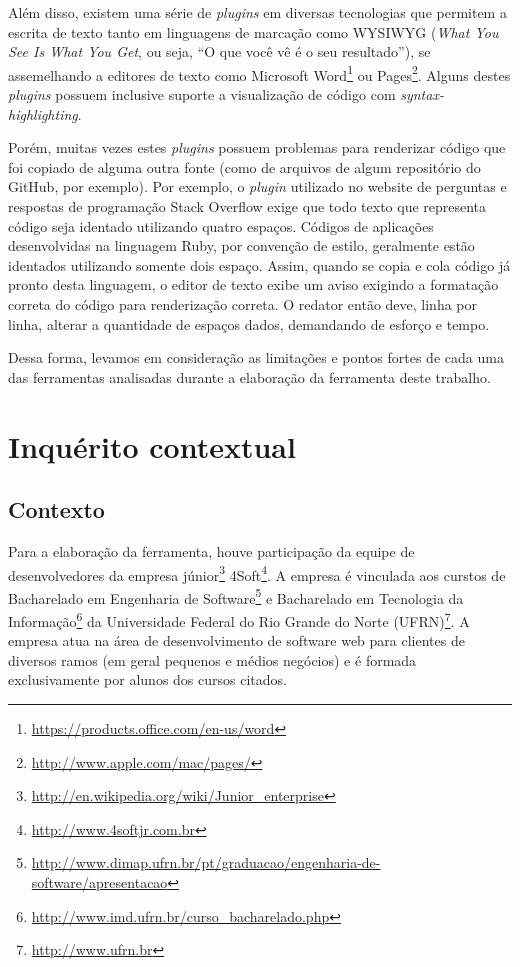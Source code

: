 Além disso, existem uma série de \textit{plugins} em diversas tecnologias que permitem a escrita de texto tanto em linguagens de marcação como WYSIWYG (\textit{What You See Is What You Get}, ou seja, ``O que você vê é o seu resultado''), se assemelhando a editores de texto como Microsoft Word\footnote{\url{https://products.office.com/en-us/word}} ou Pages\footnote{\url{http://www.apple.com/mac/pages/}}. Alguns destes \textit{plugins} possuem inclusive suporte a visualização de código com \textit{syntax-highlighting}.

Porém, muitas vezes estes \textit{plugins} possuem problemas para renderizar código que foi copiado de alguma outra fonte (como de arquivos de algum repositório do GitHub, por exemplo). Por exemplo, o \textit{plugin} utilizado no website de perguntas e respostas de programação Stack Overflow exige que todo texto que representa código seja identado utilizando quatro espaços. Códigos de aplicações desenvolvidas na linguagem Ruby, por convenção de estilo, geralmente estão identados utilizando somente dois espaço. Assim, quando se copia e cola código já pronto desta linguagem, o editor de texto exibe um aviso exigindo a formatação correta do código para renderização correta. O redator então deve, linha por linha, alterar a quantidade de espaços dados, demandando de esforço e tempo.


Dessa forma, levamos em consideração as limitações e pontos fortes de cada uma das ferramentas analisadas durante a elaboração da ferramenta deste trabalho.

\section{Inquérito contextual}


\subsection{Contexto}

Para a elaboração da ferramenta, houve participação da equipe de desenvolvedores da empresa júnior\footnote{\url{http://en.wikipedia.org/wiki/Junior_enterprise}} 4Soft\footnote{\url{http://www.4softjr.com.br}}. A empresa é vinculada aos curstos de Bacharelado em Engenharia de Software\footnote{\url{http://www.dimap.ufrn.br/pt/graduacao/engenharia-de-software/apresentacao}} e Bacharelado em Tecnologia da Informação\footnote{\url{http://www.imd.ufrn.br/curso_bacharelado.php}} da Universidade Federal do Rio Grande do Norte (UFRN)\footnote{\url{http://www.ufrn.br}}. A empresa atua na área de desenvolvimento de software web para clientes de diversos ramos (em geral pequenos e médios negócios) e é formada exclusivamente por alunos dos cursos citados.

